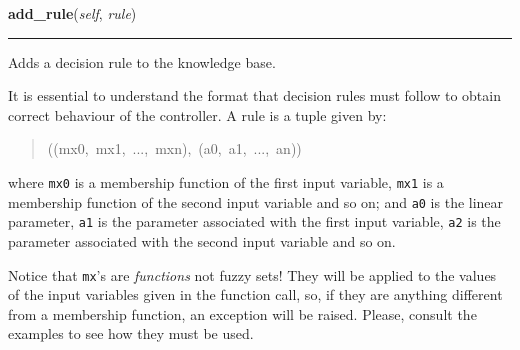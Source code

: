     \begin{boxedminipage}{\textwidth}

    \raggedright \textbf{add\_rule}(\textit{self}, \textit{rule})

    \vspace{-1.5ex}

    \rule{\textwidth}{0.5\fboxrule}

Adds a decision rule to the knowledge base.

It is essential to understand the format that decision rules must follow
to obtain correct behaviour of the controller. A rule is a tuple given
by:
\begin{quote}{\ttfamily \raggedright \noindent
((mx0,~mx1,~...,~mxn),~(a0,~a1,~...,~an))
}\end{quote}

where \texttt{mx0} is a membership function of the first input variable,
\texttt{mx1} is a membership function of the second input variable and so on;
and \texttt{a0} is the linear parameter, \texttt{a1} is the parameter associated
with the first input variable, \texttt{a2} is the parameter associated with
the second input variable and so on.

Notice that \texttt{mx}'s are \emph{functions} not fuzzy sets! They will be
applied to the values of the input variables given in the function call,
so, if they are anything different from a membership function, an
exception will be raised. Please, consult the examples to see how they
must be used.
    \vspace{1ex}

    \end{boxedminipage}

    \label{peach:fuzzy:control:Parametric:eval}

    \vspace{0.5ex}

